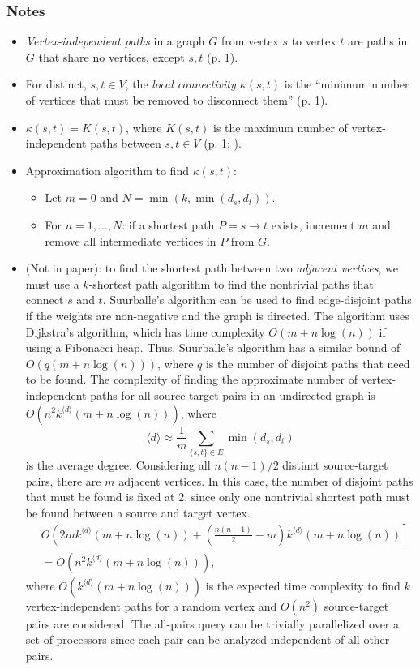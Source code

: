 \subsubsection*{Notes}
\begin{itemize}
\item \emph{Vertex-independent paths} in a graph $G$ from vertex $s$ to vertex $t$ are paths in $G$ that share no vertices, except $s, t$ (p. 1).
\item For distinct, $s, t \in V$, the \emph{local connectivity $\kappa(s, t)$} is the ``minimum number of vertices that must be removed to disconnect them'' (p. 1).
\item $\kappa(s, t) = K(s, t)$, where $K(s, t)$ is the maximum number of vertex-independent paths between $s, t \in V$ (p. 1; \cite{Menger1927}).
\item Approximation algorithm to find $\kappa(s, t)$:
    \begin{itemize}
        \item Let $m = 0$ and $N = \min(k, \min(d_s, d_t))$.
        \item For $n = 1, \ldots, N$: if a shortest path $P = s \rightarrow t$ exists, increment $m$ and remove all intermediate vertices in $P$ from $G$.
    \end{itemize}
\item (Not in paper): to find the shortest path between two \emph{adjacent vertices}, we must use a $k$-shortest path algorithm to find the nontrivial paths that connect $s$ and $t$. Suurballe's algorithm can be used to find edge-disjoint paths if the weights are non-negative and the graph is directed. The algorithm uses Dijkstra's algorithm, which has time complexity $O(m + n \log(n))$ if using a Fibonacci heap. Thus, Suurballe's algorithm has a similar bound of $O(q(m + n \log(n)))$, where $q$ is the number of disjoint paths that need to be found.
\newcommand{\davg}{\langle d \rangle}
The complexity of finding the approximate number of vertex-independent paths for all source-target pairs in an undirected graph is $O(n^2 k^{\davg} (m + n \log(n)))$, where
    \begin{equation*}
        \davg \approx \frac{1}{m}\sum_{\{s, t\} \in E} \min(d_s, d_t)
    \end{equation*}
is the average degree. Considering all $n(n - 1)/2$ distinct source-target pairs, there are $m$ adjacent vertices. In this case, the number of disjoint paths that must be found is fixed at 2, since only one nontrivial shortest path must be found between a source and target vertex.
    \begin{align*}
        & O\left(2m k^{\davg} (m + n \log(n)) + \left(\frac{n(n - 1)}{2} - m\right) k^{\davg} (m + n \log(n)) \right] \\
        &= O \left(n^2 k^{\davg}(m + n \log(n))\right),
    \end{align*}
where $O(k^{\davg}(m + n \log(n)))$ is the expected time complexity to find $k$ vertex-independent paths for a random vertex and $O(n^2)$ source-target pairs are considered. The all-pairs query can be trivially parallelized over a set of processors since each pair can be analyzed independent of all other pairs.
\end{itemize}

